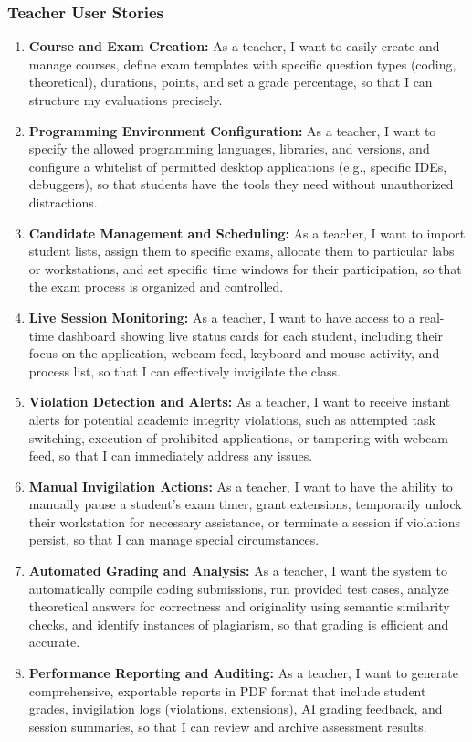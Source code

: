 \subsubsection{Teacher User Stories}
\begin{enumerate}
    \item \textbf{Course and Exam Creation:} As a teacher, I want to easily create and manage courses, define exam templates with specific question types (coding, theoretical), durations, points, and set a grade percentage, so that I can structure my evaluations precisely.
    \item \textbf{Programming Environment Configuration:} As a teacher, I want to specify the allowed programming languages, libraries, and versions, and configure a whitelist of permitted desktop applications (e.g., specific IDEs, debuggers), so that students have the tools they need without unauthorized distractions.
    \item \textbf{Candidate Management and Scheduling:} As a teacher, I want to import student lists, assign them to specific exams, allocate them to particular labs or workstations, and set specific time windows for their participation, so that the exam process is organized and controlled.
    \item \textbf{Live Session Monitoring:} As a teacher, I want to have access to a real-time dashboard showing live status cards for each student, including their focus on the application, webcam feed, keyboard and mouse activity, and process list, so that I can effectively invigilate the class.
    \item \textbf{Violation Detection and Alerts:} As a teacher, I want to receive instant alerts for potential academic integrity violations, such as attempted task switching, execution of prohibited applications, or tampering with webcam feed, so that I can immediately address any issues.
    \item \textbf{Manual Invigilation Actions:} As a teacher, I want to have the ability to manually pause a student's exam timer, grant extensions, temporarily unlock their workstation for necessary assistance, or terminate a session if violations persist, so that I can manage special circumstances.
    \item \textbf{Automated Grading and Analysis:} As a teacher, I want the system to automatically compile coding submissions, run provided test cases, analyze theoretical answers for correctness and originality using semantic similarity checks, and identify instances of plagiarism, so that grading is efficient and accurate.
    \item \textbf{Performance Reporting and Auditing:} As a teacher, I want to generate comprehensive, exportable reports in PDF format that include student grades, invigilation logs (violations, extensions), AI grading feedback, and session summaries, so that I can review and archive assessment results.
\end{enumerate}

